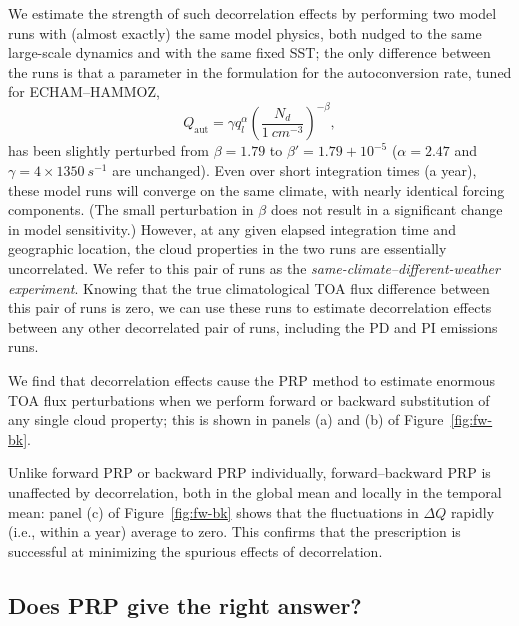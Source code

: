 \documentclass[acp, manuscript]{copernicus}\usepackage[]{graphicx}\usepackage[]{color}
\newcommand\nd{\ensuremath{N_d}}
\begin{document}
We estimate the strength of such decorrelation effects by performing two model
runs with (almost exactly) the same model physics, both nudged to the same
large-scale dynamics and with the same fixed SST; the only difference between
the runs is that a parameter in the \citet{Khairoutdinov2000} formulation for
the autoconversion rate, tuned for ECHAM--HAMMOZ,
\begin{equation}
  \label{eq:kk2000}
  Q_\text{aut} = \gamma q_l^\alpha \left(\frac{\nd}{1~\unit{cm^{-3}}}\right)^{-\beta},
\end{equation}
has been slightly perturbed from $\beta = 1.79$ to $\beta' = 1.79 + 10^{-5}$
($\alpha = 2.47$ and $\gamma = 4\times 1350~\unit{s^{-1}}$ are unchanged).  Even
over short integration times (a year), these model runs will converge on the
same climate, with nearly identical forcing components.  (The small perturbation
in $\beta$ does not result in a significant change in model sensitivity.)
However, at any given elapsed integration time and geographic location, the
cloud properties in the two runs are essentially uncorrelated.  We refer to this
pair of runs as the \textit{same-climate--different-weather experiment}.
Knowing that the true climatological TOA flux difference between this pair of
runs is zero, we can use these runs to estimate decorrelation effects between
any other decorrelated pair of runs, including the PD and PI emissions runs.

We find that decorrelation effects cause the PRP method to estimate enormous TOA
flux perturbations when we perform forward or backward substitution of any
single cloud property; this is shown in panels (a) and (b) of
Figure~\ref{fig:fw-bk}.  

Unlike forward PRP or backward PRP individually, forward--backward PRP is
unaffected by decorrelation, both in the global mean and locally in the temporal
mean: panel (c) of Figure~\ref{fig:fw-bk} shows that the fluctuations in
$\Delta Q$ rapidly (i.e., within a year) average to zero.  This confirms
that the \citet{Colman1997} prescription is successful at minimizing the
spurious effects of decorrelation.

\subsection{Does PRP give the right answer?}
\label{sec:ideal}
\end{document}
